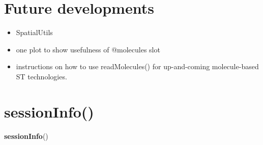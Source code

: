 \documentclass[
]{article}
\newenvironment{Shaded}{\begin{snugshade}}{\end{snugshade}}
\newcommand{\KeywordTok}[1]{\textcolor[rgb]{0.13,0.29,0.53}{\textbf{#1}}}
\newcommand{\NormalTok}[1]{#1}
\providecommand{\tightlist}{%
  \setlength{\itemsep}{0pt}\setlength{\parskip}{0pt}}
\begin{document}
\hypertarget{future-developments}{%
\section{Future developments}\label{future-developments}}

\begin{itemize}
\tightlist
\item
  SpatialUtils
\item
  one plot to show usefulness of @molecules slot
\item
  instructions on how to use readMolecules() for up-and-coming
  molecule-based ST technologies.
\end{itemize}

\hypertarget{sessioninfo}{%
\section{sessionInfo()}\label{sessioninfo}}

\begin{Shaded}
\begin{Highlighting}[]
\KeywordTok{sessionInfo}\NormalTok{()}
\end{Highlighting}
\end{Shaded}
\end{document}
